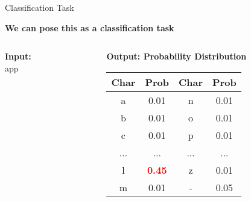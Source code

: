 \documentclass[usenames,dvipsnames]{beamer}
\begin{document}
\begin{frame}{Classification Task}
\begin{center}
\end{center}

\vspace{0.5cm}
\begin{center}
\textbf{\Large We can pose this as a classification task}
\end{center}

\vspace{0.5cm}
\begin{columns}
\begin{column}{0.3\textwidth}
\begin{center}
\textbf{Input:}\\
\Large app
\end{center}
\end{column}
\begin{column}{0.7\textwidth}
\begin{center}
\textbf{Output: Probability Distribution}
\small
\begin{tabular}{|c|c||c|c|}
\hline
\textbf{Char} & \textbf{Prob} & \textbf{Char} & \textbf{Prob} \\
\hline
a & 0.01 & n & 0.01 \\
b & 0.01 & o & 0.01 \\
c & 0.01 & p & 0.01 \\
... & ... & ... & ... \\
l & \textcolor{red}{\textbf{0.45}} & z & 0.01 \\
m & 0.01 & - & 0.05 \\
\hline
\end{tabular}
\end{center}
\end{column}
\end{columns}
\end{frame}
\end{document}
